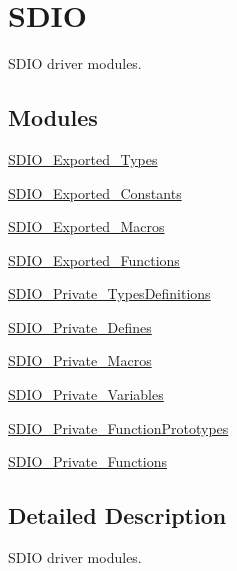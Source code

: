 \hypertarget{group___s_d_i_o}{}\section{S\+D\+IO}
\label{group___s_d_i_o}


S\+D\+IO driver modules.  


\subsection*{Modules}
\begin{DoxyCompactItemize}
\item 
\mbox{\hyperlink{group___s_d_i_o___exported___types}{S\+D\+I\+O\+\_\+\+Exported\+\_\+\+Types}}
\item 
\mbox{\hyperlink{group___s_d_i_o___exported___constants}{S\+D\+I\+O\+\_\+\+Exported\+\_\+\+Constants}}
\item 
\mbox{\hyperlink{group___s_d_i_o___exported___macros}{S\+D\+I\+O\+\_\+\+Exported\+\_\+\+Macros}}
\item 
\mbox{\hyperlink{group___s_d_i_o___exported___functions}{S\+D\+I\+O\+\_\+\+Exported\+\_\+\+Functions}}
\item 
\mbox{\hyperlink{group___s_d_i_o___private___types_definitions}{S\+D\+I\+O\+\_\+\+Private\+\_\+\+Types\+Definitions}}
\item 
\mbox{\hyperlink{group___s_d_i_o___private___defines}{S\+D\+I\+O\+\_\+\+Private\+\_\+\+Defines}}
\item 
\mbox{\hyperlink{group___s_d_i_o___private___macros}{S\+D\+I\+O\+\_\+\+Private\+\_\+\+Macros}}
\item 
\mbox{\hyperlink{group___s_d_i_o___private___variables}{S\+D\+I\+O\+\_\+\+Private\+\_\+\+Variables}}
\item 
\mbox{\hyperlink{group___s_d_i_o___private___function_prototypes}{S\+D\+I\+O\+\_\+\+Private\+\_\+\+Function\+Prototypes}}
\item 
\mbox{\hyperlink{group___s_d_i_o___private___functions}{S\+D\+I\+O\+\_\+\+Private\+\_\+\+Functions}}
\end{DoxyCompactItemize}


\subsection{Detailed Description}
S\+D\+IO driver modules. 

